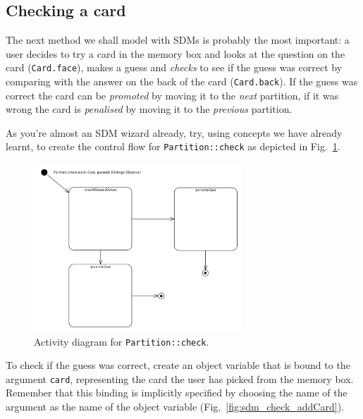 \subsection{Checking a card}

The next method we shall model with SDMs is probably the most important: a
user decides to try a card in the memory box and looks at the question on the
card (\texttt{Card.face}), makes a guess and \emph{checks} to see if the guess
was correct by comparing with the answer on the back of the card
(\texttt{Card.back}).  If the guess was correct the card can be \emph{promoted}
by moving it to the \emph{next} partition, if it was wrong the card is
\emph{penalised} by moving it to the \emph{previous} partition.

As you're almost an SDM wizard already, try, using concepts we have
already learnt, to create the control flow for \texttt{Partition::check} as
depicted in Fig.~\ref{fig:sdm_check_start}.

\begin{figure}[htbp]
\begin{center}
  \includegraphics[width=0.7\textwidth]{pics/sdmBilder/check/sdm16RAW}
  \caption{Activity diagram for \texttt{Partition::check}.}  
  \label{fig:sdm_check_start}
\end{center}
\end{figure}
 
To check if the guess was correct, create an object variable that is bound to
the argument \texttt{card}, representing the card the user has picked from the
memory box.  Remember that this binding is implicitly specified by choosing the
name of the argument as the name of the object variable
(Fig.~\ref{fig:sdm_check_addCard}).

\clearpage


